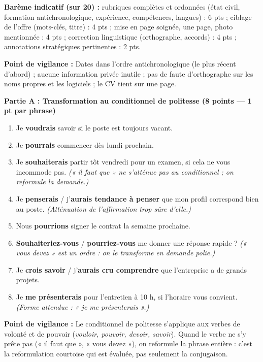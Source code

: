 \documentclass[11pt]{article}
\begin{document}
\begin{corrige}
\textbf{Barème indicatif (sur 20) :} rubriques complètes et ordonnées (état civil, formation antichronologique, expérience, compétences, langues) : 6 pts ; ciblage de l'offre (mots-clés, titre) : 4 pts ; mise en page soignée, une page, photo mentionnée : 4 pts ; correction linguistique (orthographe, accords) : 4 pts ; annotations stratégiques pertinentes : 2 pts.

\textbf{Point de vigilance :} Dates dans l'ordre antichronologique (le plus récent d'abord) ; aucune information privée inutile ; pas de faute d'orthographe sur les noms propres et les logiciels ; le CV tient sur une page.
\end{corrige}

\begin{corrige}
\textbf{Partie A : Transformation au conditionnel de politesse (8 points — 1 pt par phrase)}
\begin{enumerate}
\item Je \textbf{voudrais} savoir si le poste est toujours vacant.
\item Je \textbf{pourrais} commencer dès lundi prochain.
\item Je \textbf{souhaiterais} partir tôt vendredi pour un examen, si cela ne vous incommode pas. \textit{(« il faut que » ne s'atténue pas au conditionnel ; on reformule la demande.)}
\item Je \textbf{penserais} / j'\textbf{aurais tendance à penser} que mon profil correspond bien au poste. \textit{(Atténuation de l'affirmation trop sûre d'elle.)}
\item Nous \textbf{pourrions} signer le contrat la semaine prochaine.
\item \textbf{Souhaiteriez-vous} / \textbf{pourriez-vous} me donner une réponse rapide ? \textit{(« vous devez » est un ordre : on le transforme en demande polie.)}
\item Je \textbf{crois savoir} / j'\textbf{aurais cru comprendre} que l'entreprise a de grands projets.
\item Je \textbf{me présenterais} pour l'entretien à 10 h, si l'horaire vous convient. \textit{(Forme attendue : « je me présenterais ».)}
\end{enumerate}

\textbf{Point de vigilance :} Le conditionnel de politesse s'applique aux verbes de volonté et de pouvoir (\emph{vouloir, pouvoir, devoir, savoir}). Quand le verbe ne s'y prête pas (« il faut que », « vous devez »), on reformule la phrase entière : c'est la reformulation courtoise qui est évaluée, pas seulement la conjugaison.


\end{corrige}
\end{document}
